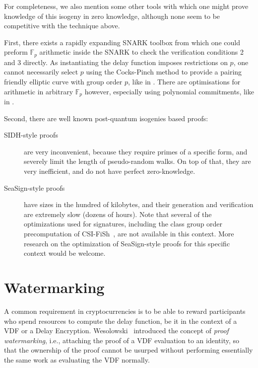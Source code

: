 \documentclass{llncs}
\newcommand{\F}{\mathbb{F}}
\begin{document}
\smallskip

For completeness, we also mention some other tools with which one
might prove knowledge of this isogeny in zero knowledge, although none
seem to be competitive with the technique above.
 
First, there exists a rapidly expanding SNARK toolbox from which
one could preform $\F_p$ arithmetic inside the SNARK to check the
verification conditions 2 and 3 directly.  
As instantiating the delay function imposes restrictions on $p$,
one cannot necessarily select $p$ using the Cocks-Pinch method to
provide a pairing friendly elliptic curve with group order $p$, 
like in \cite{ZEXE}. %
There are optimisations for arithmetic in arbitrary $\F_p$ 
however, especially using polynomial commitments,
like in \cite{plookup}. %

Second, there are well known post-quantum isogenies based proofs:
\begin{description}
\item[SIDH-style proofs~\cite{defeo+jao+plut12}] %
  are very inconvenient, because they require primes of a specific
  form, and severely limit the length of pseudo-random walks. %
  On top of that, they are very inefficient, and do not have perfect
  zero-knowledge. %
\item[SeaSign-style proofs~\cite{10.1007/978-3-030-17659-4_26}] %
  have sizes in the hundred of kilobytes, and their generation and
  verification are extremely slow (dozens of hours). %
  Note that several of the optimizations used for signatures,
  including the class group order precomputation of
  CSI-FiSh~\cite{10.1007/978-3-030-34578-5_9}, are not available in
  this context. %
  More research on the optimization of SeaSign-style proofs for this
  specific context would be welcome.
\end{description}


\section{Watermarking}
\label{sec:watermarking}

A common requirement in cryptocurrencies is to be able to reward
participants who spend resources to compute the delay function, be it
in the context of a VDF or a Delay Encryption. %
Wesolowski~\cite{Wesolowski} introduced the concept of \emph{proof
  watermarking}, i.e., attaching the proof of a VDF evaluation to an
identity, so that the ownership of the proof cannot be usurped without
performing essentially the same work as evaluating the VDF normally.
\end{document}
